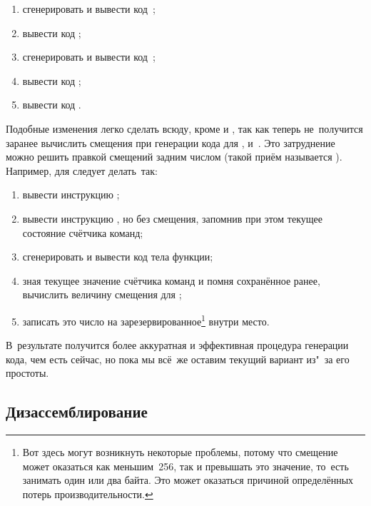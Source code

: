 \begin{enumerate}
  \item сгенерировать и вывести код~;
  \item вывести код ;
  \item сгенерировать и вывести код~;
  \item вывести код ;
  \item вывести код .
\end{enumerate}

Подобные изменения легко сделать всюду, кроме  и , так
как теперь не~получится заранее вычислить смещения при генерации кода для
,  и~. Это затруднение
можно решить правкой смещений задним числом (такой приём называется
). Например, для  следует делать~так:

\begin{enumerate}
  \item вывести инструкцию ;

  \item вывести инструкцию , но без смещения, запомнив при этом
        текущее состояние счётчика команд;

  \item сгенерировать и вывести код тела функции;

  \item зная текущее значение счётчика команд и помня сохранённое ранее,
        вычислить величину смещения для ;

  \item записать это число на зарезервированное\footnote{Вот здесь могут
        возникнуть некоторые проблемы, потому что смещение может оказаться
        как меньшим~256, так и превышать это значение, то~есть занимать
        один или два байта. Это может оказаться причиной определённых
        потерь производительности.} внутри  место.
\end{enumerate}

В~результате получится более аккуратная и эффективная процедура генерации кода,
чем есть сейчас, но пока мы всё~же оставим текущий вариант из"~за его простоты.


\subsection{Дизассемблирование}%
\label{compilation/lang-and-target/ssect:disassembly}

